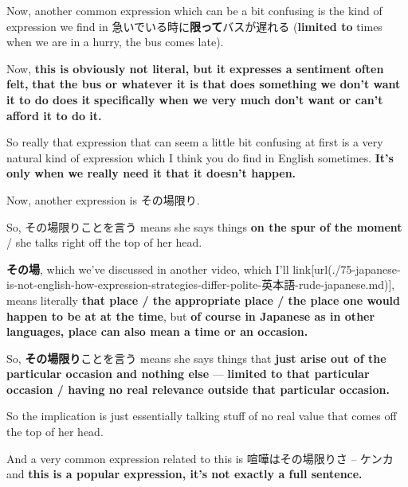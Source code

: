 \thinrule

Now, another common expression which can be a bit confusing is the kind of expression we find in 急いでいる時に{\bf 限って}バスが遅れる ({\bf limited to} times when we are in a hurry, the bus comes late).

{}

Now, {\bf this is obviously not literal, but it expresses a sentiment often felt,} {\bf that the bus or whatever it is that does something we don't want it to do does it} {\bf specifically when we very much don't want or can't afford it to do it.}

So really that expression that can seem a little bit confusing at first is a very natural kind of expression which I think you do find in English sometimes. {\bf It's only when we really need it that it doesn't happen.}

\startsectionlevel[title={その場限り},reference={その場限り}]

Now, another expression is その場限り.

So, その場限りことを言う means she says things {\bf on the spur of the moment} / she talks right off the top of her head.

{}

{\bf その場}, which we've discussed in another video, which I'll link\goto{{[}75{]}}[url(./75-japanese-is-not-english-how-expression-strategies-differ-polite-英本語-rude-japanese.md)], means literally {\bf that place / the appropriate place / the place one would happen to be at at the time}, but {\bf of course in Japanese as in other languages, place can also mean a time or an occasion.}

\thinrule

So, {\bf その場限り}ことを言う means she says things that {\bf just arise out of the particular occasion and nothing else} --- {\bf limited to that particular occasion / having no real relevance outside that particular occasion.}

So the implication is just essentially talking stuff of no real value that comes off the top of her head.

\stopsectionlevel

\startsectionlevel[title={その場限りさ},reference={その場限りさ}]

And a very common expression related to this is 喧嘩はその場限りさ -- ケンカ and {\bf this is a popular expression, it's not exactly a full sentence.}

